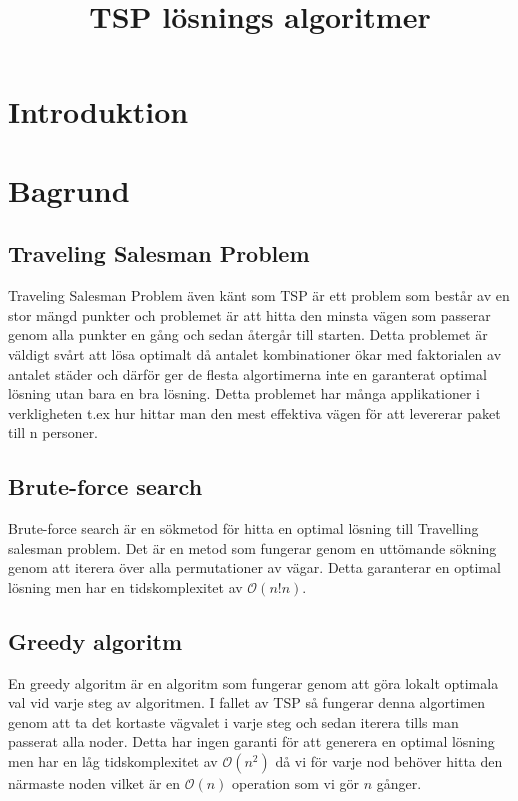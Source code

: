 \documentclass[conference]{IEEEtran}
\begin{document}
\title{TSP lösnings algoritmer}

\author{
\and
{}
\and
{}
}

\maketitle
\section{Introduktion}

\section{Bagrund}
\subsection{Traveling Salesman Problem}
Traveling Salesman Problem även känt som TSP är ett problem som består av en stor mängd punkter och problemet är att hitta den minsta vägen som passerar genom alla punkter en gång och sedan återgår till starten. Detta problemet är väldigt svårt att lösa optimalt då antalet kombinationer ökar med faktorialen av antalet städer och därför ger de flesta algortimerna inte en garanterat optimal lösning utan bara en bra lösning. Detta problemet har många applikationer i verkligheten t.ex hur hittar man den mest effektiva vägen för att levererar paket till n personer.
\subsection{Brute-force search}
Brute-force search är en sökmetod för hitta en optimal lösning till Travelling salesman problem. Det är en metod som fungerar genom en uttömande sökning genom att iterera över alla permutationer av vägar. Detta garanterar en optimal lösning men har en tidskomplexitet av $\mathcal{O}(n!n)$.
\subsection{Greedy algoritm}
En greedy algoritm är en algoritm som fungerar genom att göra lokalt optimala val vid varje steg av algoritmen. I fallet av TSP så fungerar denna algortimen genom att ta det kortaste vägvalet i varje steg och sedan iterera tills man passerat alla noder. Detta har ingen garanti för att generera en optimal lösning men har en låg tidskomplexitet av $\mathcal{O}(n^2)$ då vi för varje nod behöver hitta den närmaste noden vilket är en $\mathcal{O}(n)$ operation som vi gör $n$ gånger.
\end{document}
